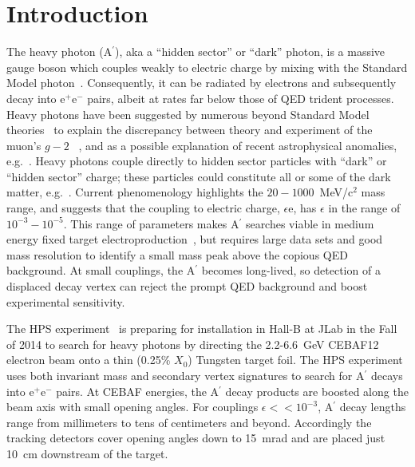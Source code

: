 \documentclass[final,3p,times,twocolumn]{elsarticle}
\newcommand{\Aprime}{A\ensuremath{^\prime}}
\newcommand{\ee}{e$^+$e$^-$}
\begin{document}
 
\newpage


\section{Introduction}
\label{introduction}
The heavy photon (\Aprime{}), aka a ``hidden sector'' or ``dark'' photon, is a massive gauge boson which 
couples weakly to electric charge by mixing with the Standard Model 
photon~\cite{Holdom:1985ag,Galison:1983pa}. Consequently, it can be radiated by electrons and subsequently decay 
into \ee{} pairs, albeit at rates far below those of QED trident processes. Heavy photons have been 
suggested by numerous beyond Standard Model theories~\cite{Essig:2013lka} to explain the 
discrepancy 
between theory and experiment of the muon's $g-2$ ~\cite{Pospelov:2008zw}, and as a possible 
explanation of recent astrophysical 
anomalies, e.g.~\cite{Adriani:2008zr,FermiLAT:2011ab,Aguilar:2013qda}.  
Heavy photons couple directly to  hidden sector particles with ``dark'' or ``hidden sector'' charge; these 
particles could constitute all or some of the dark matter, e.g.~\cite{ArkaniHamed:2008qn,Pospelov:2008jd}. 
Current phenomenology highlights the $20-1000$~MeV/c$^{2}$ mass range, and 
suggests that  the coupling to electric charge, $\epsilon$e, has $\epsilon$ in the range of 
$10^{-3} -10^{-5}$. This range of parameters makes \Aprime{} searches viable in 
medium energy fixed target electroproduction~\cite{Bjorken:2009mm}, but requires large data sets and 
good mass resolution to identify a small mass peak above the copious QED background. At small 
couplings, the \Aprime{} becomes long-lived, so detection of a displaced decay vertex can reject the prompt 
QED background and boost experimental sensitivity.  

The HPS experiment~\cite{HPS_proposal_2010} is preparing for installation in Hall-B at JLab in the Fall of 
2014 to search for heavy photons by directing the 2.2-6.6~GeV CEBAF12 electron beam onto a thin 
(0.25\% $X_{0}$) Tungsten target foil. The HPS experiment uses both 
invariant mass and secondary vertex signatures to search for \Aprime{} decays into \ee{} pairs. 
At CEBAF energies, the \Aprime{} decay products are boosted along the beam axis with small opening angles.
For couplings $\epsilon << 10^{-3}$,  \Aprime{} decay lengths range from millimeters to tens of centimeters and 
beyond. Accordingly the tracking detectors cover opening angles down to 15~mrad and are placed just 10~cm 
downstream of the target.
\end{document}
